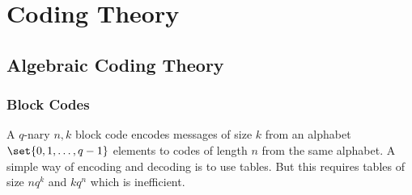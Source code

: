 \part{Coding Theory}
\chapter{Algebraic Coding Theory}
\section{Block Codes}
A \(q\)-nary \(n,k\) block code encodes messages of size \(k\) from an alphabet \(\set{0,1,\dots,q-1}\) elements to codes of length \(n\) from the same alphabet.
A simple way of encoding and decoding is to use tables. But this requires tables of size \(nq^k\) and \(kq^n\) which is inefficient.

